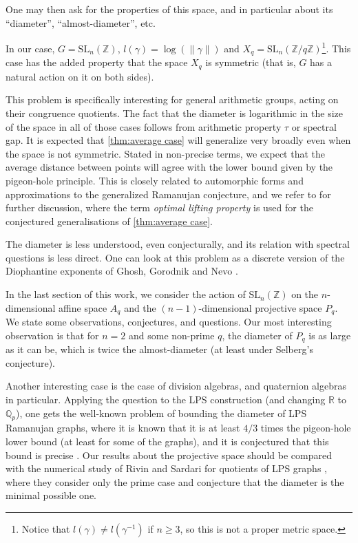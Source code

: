 \documentclass[12pt, a4paper]{amsart}
\numberwithin{equation}{section}
\theoremstyle{definition}
\newcommand{\R}{\mathbb{R}}
\newcommand{\Q}{\mathbb{Q}}
\newcommand{\Z}{\mathbb{Z}}
\newcommand{\SL}{\mathrm{SL}}
\begin{document}
One may then ask for the properties of this space, and in particular about its ``diameter'', ``almost-diameter'', etc. 

In our case, $G=\SL_{n}(\Z)$, $l(\gamma)=\log(\|\gamma\|)$ and $X_{q}=\SL_{n}(\Z/q\Z)$\footnote{Notice that $l(\gamma)\ne l(\gamma^{-1})$ if $n\ge 3$, so this is not a proper metric space.}.
This case has the added property that the space $X_q$ is symmetric (that is, $G$ has a natural action on it on both sides). 

This problem is specifically interesting for general arithmetic groups, acting on their congruence quotients. 
The fact that the diameter is logarithmic in the size of the space in all of those cases follows from arithmetic property $\tau$ or spectral gap. 
It is expected that \cref{thm:average case} will generalize very broadly even when the space is not symmetric. 
Stated in non-precise terms, we expect that the average distance between points will agree with the lower bound given by the pigeon-hole principle. 
This is closely related to automorphic forms and approximations to the generalized Ramanujan conjecture, and we refer to \cite{golubev2023sarnak} for further discussion,
where the term {\em optimal lifting property} is used for the conjectured generalisations of \cref{thm:average case}.

The diameter is less understood, even conjecturally, and its relation with spectral questions is less direct. 
One can look at this problem as a discrete version of the Diophantine exponents of Ghosh, Gorodnik and Nevo \cite{ghosh2015diophantine}.

In the last section of this work, we consider the action of $\SL_{n}(\Z)$ on 
the $n$-dimensional affine space $A_{q}$ and the $(n-1)$-dimensional projective space $P_{q}$. 
We state some observations, conjectures, and questions. Our most interesting observation is that for $n=2$ and some non-prime $q$, the diameter of $P_q$ is as large as it can be, which is twice the almost-diameter (at least under Selberg's conjecture). 

Another interesting case is the case of division algebras, and quaternion algebras in particular. Applying the question to the LPS construction (and changing $\R$ to $\Q_{p}$), one gets the well-known problem of bounding the diameter of LPS Ramanujan graphs, where it is known that it is at least $4/3$ times the pigeon-hole lower bound (at least for some of the graphs), and it is conjectured that this bound is precise \cite{sardari2019diameter}. Our results about the projective space should be compared with the numerical study of Rivin and Sardari for quotients of LPS graphs \cite{rivin2019quantum}, where they consider only the prime case and conjecture that the diameter is the minimal possible one.
\end{document}
